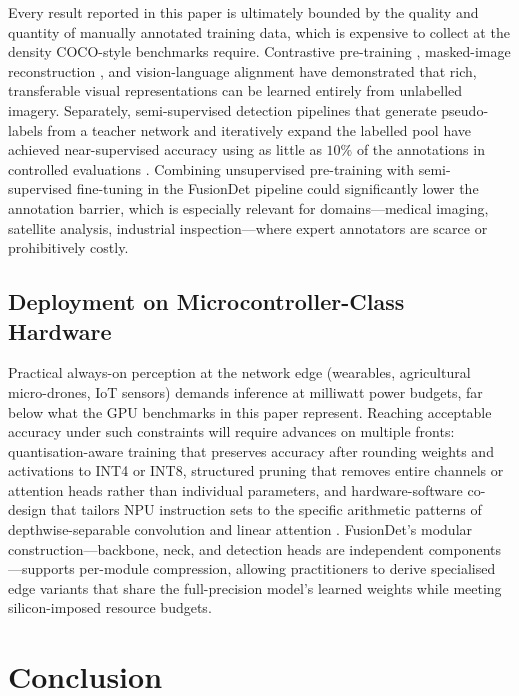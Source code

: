 Every result reported in this paper is ultimately bounded by the quality and
quantity of manually annotated training data, which is expensive to collect
at the density COCO-style benchmarks require. Contrastive
pre-training \cite{he2020momentum}, masked-image
reconstruction \cite{he2022masked}, and vision-language
alignment \cite{radford2021learning} have demonstrated that rich, transferable
visual representations can be learned entirely from unlabelled imagery.
Separately, semi-supervised detection pipelines that generate pseudo-labels
from a teacher network and iteratively expand the labelled pool have achieved
near-supervised accuracy using as little as $10\%$ of the annotations in
controlled evaluations \cite{liu2021unbiased}. Combining unsupervised
pre-training with semi-supervised fine-tuning in the FusionDet pipeline could
significantly lower the annotation barrier, which is especially relevant for
domains—medical imaging, satellite analysis, industrial inspection—where
expert annotators are scarce or prohibitively costly.

\subsection{Deployment on Microcontroller-Class Hardware}

Practical always-on perception at the network edge (wearables,
agricultural micro-drones, IoT sensors) demands inference at milliwatt power
budgets, far below what the GPU benchmarks in this paper represent. Reaching
acceptable accuracy under such constraints will require advances on multiple
fronts: quantisation-aware training that preserves accuracy after rounding
weights and activations to INT4 or INT8, structured pruning that removes
entire channels or attention heads rather than individual parameters, and
hardware-software co-design that tailors NPU instruction sets to the
specific arithmetic patterns of depthwise-separable convolution and linear
attention \cite{wu2019fbnet}. FusionDet's modular construction—backbone,
neck, and detection heads are independent components—supports per-module
compression, allowing practitioners to derive specialised edge variants that
share the full-precision model's learned weights while meeting silicon-imposed
resource budgets.

\section{Conclusion}
\label{sec:conclusion}

